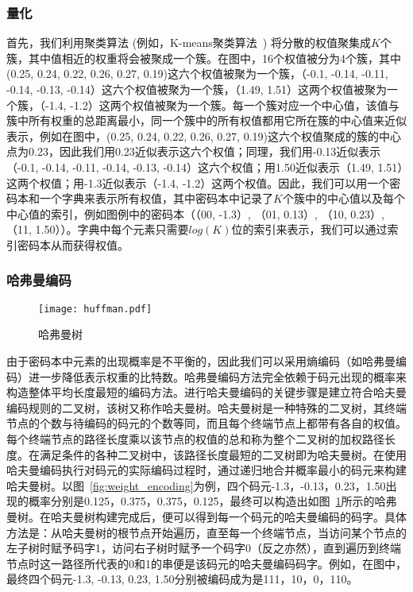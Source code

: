 \subsubsection{量化}
首先，我们利用聚类算法 (例如，K-means聚类算法~\cite{}) 将分散的权值聚集成$K$个簇，其中值相近的权重将会被聚成一个簇。在图中，16个权值被分为4个簇，其中 (0.25, 0.24, 0.22, 0.26, 0.27, 0.19)这六个权值被聚为一个簇，（-0.1, -0.14, -0.11, -0.14, -0.13, -0.14）这六个权值被聚为一个簇，（1.49, 1.51）这两个权值被聚为一个簇，（-1.4, -1.2）这两个权值被聚为一个簇。每一个簇对应一个中心值，该值与簇中所有权重的总距离最小，同一个簇中的所有权值都用它所在簇的中心值来近似表示，例如在图中，(0.25, 0.24, 0.22, 0.26, 0.27, 0.19)这六个权值聚成的簇的中心点为0.23，因此我们用0.23近似表示这六个权值；同理，我们用-0.13近似表示（-0.1, -0.14, -0.11, -0.14, -0.13, -0.14）这六个权值；用1.50近似表示（1.49, 1.51）这两个权值；用-1.3近似表示（-1.4, -1.2）这两个权值。因此，我们可以用一个密码本和一个字典来表示所有权值，其中密码本中记录了$K$个簇中的中心值以及每个中心值的索引，例如图例中的密码本（（00, -1.3）, （01, 0.13）, （10, 0.23）, （11, 1.50））。字典中每个元素只需要$log(K)$位的索引来表示，我们可以通过索引密码本从而获得权值。

\subsubsection{哈弗曼编码}

\begin{figure}[h]
\centering
\texttt{[image: huffman.pdf]}
\caption{哈弗曼树}
\label{fig:huffman}
\end{figure}

由于密码本中元素的出现概率是不平衡的，因此我们可以采用熵编码（如哈弗曼编码）进一步降低表示权重的比特数。哈弗曼编码方法完全依赖于码元出现的概率来构造整体平均长度最短的编码方法。进行哈夫曼编码的关键步骤是建立符合哈夫曼编码规则的二叉树，该树又称作哈夫曼树。哈夫曼树是一种特殊的二叉树，其终端节点的个数与待编码的码元的个数等同，而且每个终端节点上都带有各自的权值。每个终端节点的路径长度乘以该节点的权值的总和称为整个二叉树的加权路径长度。在满足条件的各种二叉树中，该路径长度最短的二叉树即为哈夫曼树。在使用哈夫曼编码执行对码元的实际编码过程时，通过递归地合并概率最小的码元来构建哈夫曼树。以图~\ref{fig:weight_encoding}为例，四个码元-1.3，-0.13，0.23，1.50出现的概率分别是0.125，0.375，0.375，0.125，最终可以构造出如图~\ref{fig:huffman}所示的哈弗曼树。在哈夫曼树构建完成后，便可以得到每一个码元的哈夫曼编码的码字。具体方法是：从哈夫曼树的根节点开始遍历，直至每一个终端节点，当访问某个节点的左子树时赋予码字1，访问右子树时赋予一个码字0（反之亦然），直到遍历到终端节点时这一路径所代表的0和1的串便是该码元的哈夫曼编码码字。例如，在图中，最终四个码元-1.3, -0.13, 0.23, 1.50分别被编码成为是111，10，0，110。

